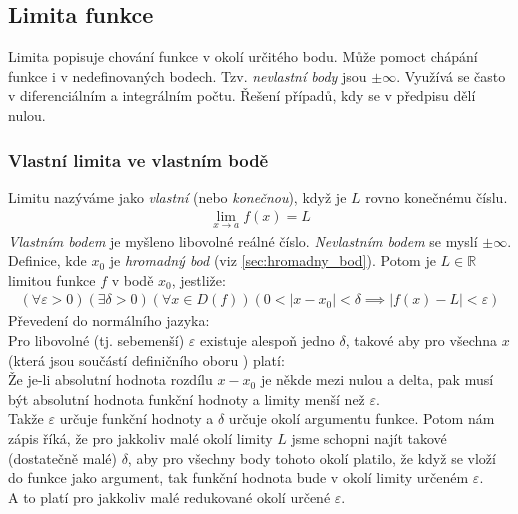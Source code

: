 \documentclass[12pt]{article}
\providecommand{\abs}[1]{\lvert#1\rvert}
\newcommand{\nR}{\mathbb{R}} %
\begin{document}
\subsection{Limita funkce}
Limita popisuje chování funkce v okolí určitého bodu. Může pomoct chápání funkce i v nedefinovaných bodech. Tzv. \emph{nevlastní body} jsou $\pm \infty$. Využívá se často v diferenciálním a integrálním počtu. Řešení případů, kdy se v předpisu dělí nulou.
\subsubsection{Vlastní limita ve vlastním bodě}
Limitu nazýváme jako \emph{vlastní} (nebo \emph{konečnou}), když je $L$ rovno konečnému číslu.
\begin{align}
\lim_{x \to a} f(x) = L
\end{align}
\emph{Vlastním bodem} je myšleno libovolné reálné číslo. \emph{Nevlastním bodem} se myslí $\pm \infty$. Definice, kde $x_0$ je \emph{hromadný bod} (viz \ref{sec:hromadny_bod}). Potom je $L \in \nR$ limitou funkce $f$ v bodě $x_0$, jestliže:
\begin{align}
( \forall \varepsilon >0)( \exists \delta >0)( \forall x \in D(f))(0< \abs{x-x_0}<\delta \implies \abs{f(x)-L} < \varepsilon)
\end{align}
Převedení do normálního jazyka:\\ Pro libovolné (tj. sebemenší) $\varepsilon$ existuje alespoň jedno $\delta$, takové aby pro všechna $x$ (která jsou součástí definičního oboru ) platí:\\
Že je-li absolutní hodnota rozdílu $x -x_0$ je někde mezi nulou a delta, pak musí být absolutní hodnota funkční hodnoty a limity menší než $\varepsilon$.\\
Takže $\varepsilon$ určuje funkční hodnoty a $\delta$ určuje okolí argumentu funkce. Potom nám zápis říká, že pro jakkoliv malé okolí limity $L$ jsme schopni najít takové (dostatečně malé) $\delta$, aby pro všechny body tohoto okolí platilo, že když se vloží do funkce jako argument, tak funkční hodnota bude v okolí limity určeném $\varepsilon$.\\
A to platí pro jakkoliv malé redukované okolí určené $\varepsilon$.
\end{document}
